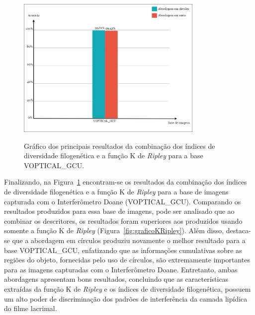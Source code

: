 


\begin{figure}[!ht]
    \centering
    \caption{Gráfico dos principais resultados da combinação dos índices de diversidade filogenética e a função K de \textit{Ripley} para a base VOPTICAL\_GCU.}
    \includegraphics[width=0.8\textwidth]{figs/graficoKRipleyIndices.png}
    \label{fig:graficoIndicesDFKRipley}
\end{figure}

Finalizando, na Figura~\ref{fig:graficoIndicesDFKRipley} encontram-se os resultados da combinação dos índices de diversidade filogenética e a função K de \textit{Ripley} para a base de imagens capturada com o Interferômetro Doane (VOPTICAL\_GCU). Comparando os resultados produzidos para essa base de imagens, pode ser analisado que ao combinar os descritores, os resultados foram superiores aos produzidos usando somente a função K de \textit{Ripley} (Figura~\ref{fig:graficoKRipley}). Além disso, destaca-se que a abordagem em círculos produziu novamente o melhor resultado para a base VOPTICAL\_GCU, enfatizando que as informações cumulativas sobre as regiões do objeto, fornecidas pelo uso de círculos, são extremamente importantes para as imagens capturadas com o Interferômetro Doane. Entretanto, ambas abordagens apresentam bons resultados, concluindo que as características extraídas da função K de \textit{Ripley} e os índices de diversidade filogenética, possuem um alto poder de discriminação dos padrões de interferência da camada lipídica do filme lacrimal.

